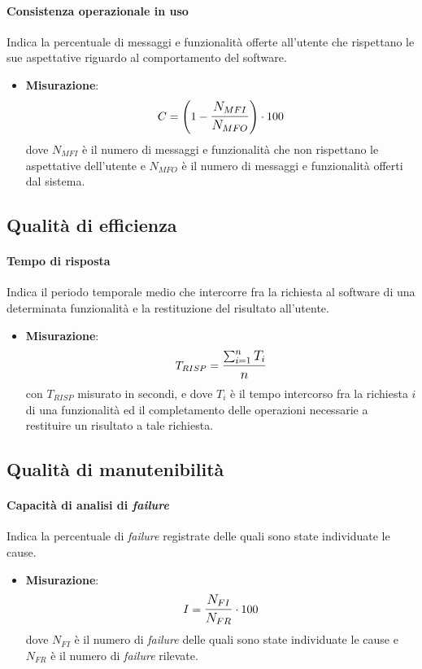 \paragraph{Consistenza operazionale in uso}
Indica la percentuale di messaggi e funzionalità offerte all'utente che rispettano le sue aspettative riguardo al comportamento del software.
\begin{itemize}
	\item \textbf{Misurazione}: 
		$$C=\left(1-\mathlarger{\frac{N_{MFI}}{N_{MFO}}}\right) \cdot 100$$
	dove $N_{MFI}$ è il numero di messaggi e funzionalità che non rispettano le aspettative dell'utente e $N_{MFO}$ è il numero di messaggi e funzionalità offerti dal sistema.
\end{itemize}

\subsection{Qualità di efficienza}

\paragraph{Tempo di risposta}
Indica il periodo temporale medio che intercorre fra la richiesta al software di una determinata funzionalità e la restituzione del risultato all'utente.
\begin{itemize}
	\item \textbf{Misurazione}: 
		$$T_{RISP} = \mathlarger{\frac{\sum_{i=1}^{n} T_{i}}{n}}$$ 
	con $T_{RISP}$ misurato in secondi, e dove $T_{i}$ è il tempo intercorso fra la richiesta $i$ di una funzionalità ed il completamento delle operazioni necessarie a restituire un risultato a tale richiesta.
\end{itemize}
\subsection{Qualità di manutenibilità}

\paragraph{Capacità di analisi di \textit{failure}}
Indica la percentuale di \textit{failure} registrate delle quali sono state individuate le cause.
\begin{itemize}
	\item \textbf{Misurazione}: 
		$$I=\mathlarger{\frac{N_{FI}}{N_{FR}}} \cdot 100$$
	dove $N_{FI}$ è il numero di \textit{failure} delle quali sono state individuate le cause e $N_{FR}$ è il numero di \textit{failure} rilevate.
\end{itemize}

